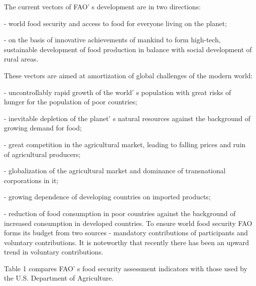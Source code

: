 \begin{multicols}{2}
The current vectors of FAO' s development are in two
directions:

- world food security and access to food for everyone living on the
planet;

- on the basis of innovative achievements of mankind to form high-tech,
sustainable development of food production in balance with social
development of rural areas.

These vectors are aimed at amortization of global challenges of the
modern world:

- uncontrollably rapid growth of the world' s population
with great risks of hunger for the population of poor countries;

- inevitable depletion of the planet' s natural resources
against the background of growing demand for food;

- great competition in the agricultural market, leading to falling
prices and ruin of agricultural producers;

- globalization of the agricultural market and dominance of
transnational corporations in it;

- growing dependence of developing countries on imported products;

- reduction of food consumption in poor countries against the background
of increased consumption in developed countries. To ensure world food
security FAO forms its budget from two sources - mandatory contributions
of participants and voluntary contributions. It is noteworthy that
recently there has been an upward trend in voluntary contributions.

Table 1 compares FAO' s food security assessment
indicators with those used by the U.S. Department of Agriculture.
\end{multicols}

